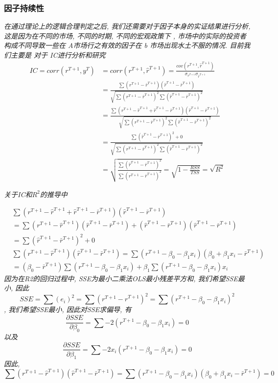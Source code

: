 \documentclass{scrartcl}
\numberwithin{equation}{section}
\begin{document}
\subsubsection{因子持续性}
\textsl{在通过理论上的逻辑合理判定之后, 我们还需要对于因子本身的实证结果进行分析, 这是因为在不同的市场, 不同的时期, 不同的宏观政策下 , 市场中的实际的投资者构成不同导致一些在 A市场行之有效的因子在 b 市场出现水土不服的情况. 目前我们主要是 对于 IC进行分析和研究}
\begin{equation}
    \begin{aligned}
        IC = corr(r^{T+1}, y^T) & = corr(r^{T+1}, \hat{r}^{T+1} ) = \frac{cov(r^{T+1}, \hat{r}^{T+1} )}{\sigma_{r^{T+1}} \sigma_{\hat{r}^{T+1}}} \\ &= \frac{\sum(r^{T+1} - \bar{r}^{T+1}) (\hat{r}^{T+1} - \bar{r}^{T+1})}{ \sqrt{\sum(r^{T+1} - \bar{r}^{T+1})^2 \sum(\hat{r}^{T+1} - \bar{r}^{T+1})^2}}\\ &=  \frac{\sum(r^{T+1} -\hat{r}^{T+1} + \hat{r}^{T+1} - \bar{r}^{T+1}) (\hat{r}^{T+1} - \bar{r}^{T+1})}{ \sqrt{\sum(r^{T+1} - \bar{r}^{T+1})^2 \sum(\hat{r}^{T+1}  - \bar{r}^{T+1})^2}} \\ &=  \frac{\sum( \hat{r}^{T+1} - \bar{r}^{T+1})^2 +0  }{ \sqrt{\sum(r^{T+1} - \bar{r}^{T+1})^2 \sum(\hat{r}^{T+1}  - \bar{r}^{T+1})^2}} \\ &= \sqrt{ \frac{\sum(\hat{r}^{T+1}  - \bar{r}^{T+1})^2}{\sum(r^{T+1} - \bar{r}^{T+1})^2 }}= \sqrt{ 1 - \frac{RSS}{TSS}} = \sqrt{R^2}
    \end{aligned}
\end{equation}

\textsl{
    关于IC和$R^2$的推导中}

\begin{equation}
    \begin{aligned}
         & \sum(r^{T+1} -\hat{r}^{T+1} + \hat{r}^{T+1} - \bar{r}^{T+1}) (\hat{r}^{T+1} - \bar{r}^{T+1})                                              \\ &=  \sum(r^{T+1} -\hat{r}^{T+1})(\hat{r}^{T+1} - \bar{r}^{T+1}) + (\hat{r}^{T+1} - \bar{r}^{T+1}) (\hat{r}^{T+1} - \bar{r}^{T+1})\\ &= \sum( \hat{r}^{T+1} - \bar{r}^{T+1})^2 +0\\
         & \sum(r^{T+1} -\hat{r}^{T+1})(\hat{r}^{T+1} - \bar{r}^{T+1}) =\sum(r^{T+1} - \beta_0 - \beta_1 x_i)(\beta_0 + \beta_1 x_i - \bar{r}^{T+1}) \\ &= (\beta_0 - \bar{r}^{T+1}) \sum(r^{T+1} - \beta_0 - \beta_1 x_i) + \beta_1 \sum(r^{T+1} - \beta_0 - \beta_1 x_i) x_i
    \end{aligned}
\end{equation}
\textsl{
    因为在R2的回归过程中, SSE为最小二乘法OLS最小残差平方和, 我们希望SSE最小, 因此$$SSE =\sum(e_i)^2 = \sum (r^{T+1} - \hat{r}^{T+1})^2 =\sum(r^{T+1} - \beta_0 - \beta_1 x_i)^2 $$, 我们希望SSE最小, 因此对SSE求偏导, 有$$ \frac{\partial SSE}{\partial \beta_0} =  \sum -2(r^{T+1}  -  \beta_0 - \beta_1 x_i ) = 0 $$ 以及 $$ \frac{\partial SSE}{\partial \beta_1} =  \sum -2 x_i(r^{T+1}  -  \beta_0 - \beta_1 x_i ) = 0 $$ 因此, $$\sum(r^{T+1} -\hat{r}^{T+1})(\hat{r}^{T+1} - \bar{r}^{T+1}) =\sum(r^{T+1} - \beta_0 - \beta_1 x_i)(\beta_0 + \beta_1 x_i - \bar{r}^{T+1}) =0$$
}
\end{document}
